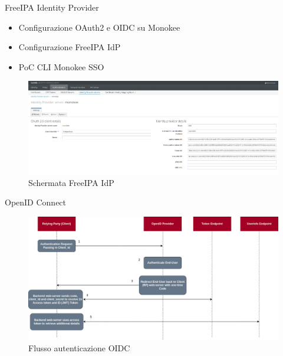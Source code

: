 \documentclass{beamer}
\begin{document}
	\begin{frame}{FreeIPA Identity Provider}
		
		\begin{itemize}
			\item Configurazione OAuth2 e OIDC su Monokee \vspace{.5em}
			\item Configurazione FreeIPA IdP \vspace{.5em}
			\item PoC CLI Monokee SSO \vspace{.5em}
		\end{itemize}
		\begin{figure}[H] 
			\centering 
			\includegraphics[width=\columnwidth]{immagini/appendici/ipa-idp.png} 
			\caption{Schermata FreeIPA IdP}
			\label{fig:ipa-idp}
		\end{figure}
		
	\end{frame}
	\begin{frame}{OpenID Connect}
		\begin{figure}[H] 
			\centering 
			\includegraphics[width=\columnwidth]{immagini/oidc-flow.png} 
			\caption{Flusso autenticazione OIDC}
			\label{fig:oidc-flow}
		\end{figure}

	\end{frame}
	
\end{document}
